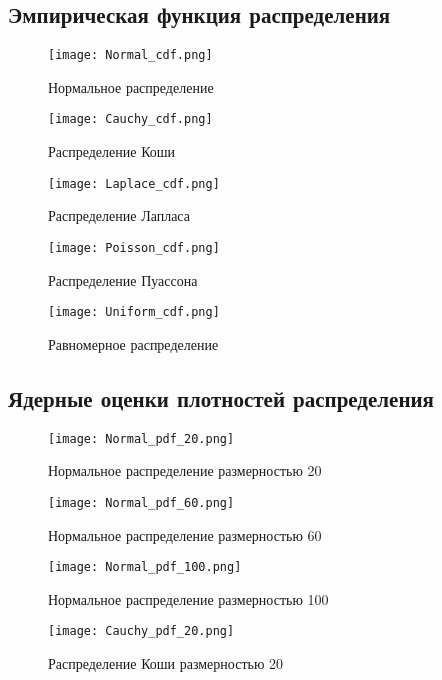 \documentclass[12pt,a4paper]{article}
\begin{document}
\subsection{Эмпирическая функция распределения}
\begin{figure}[H]
    \centering
    \texttt{[image: Normal\_cdf.png]}
    \caption{Нормальное распределение}
\end{figure}

\begin{figure}[H]
    \centering
    \texttt{[image: Cauchy\_cdf.png]}
    \caption{Распределение Коши}
\end{figure}

\begin{figure}[H]
    \centering
    \texttt{[image: Laplace\_cdf.png]}
    \caption{Распределение Лапласа}
\end{figure}

\begin{figure}[H]
    \centering
    \texttt{[image: Poisson\_cdf.png]}
    \caption{Распределение Пуассона}
\end{figure}

\begin{figure}[H]
    \centering
    \texttt{[image: Uniform\_cdf.png]}
    \caption{Равномерное распределение}
\end{figure}

\subsection{Ядерные оценки плотностей распределения}
\begin{figure}[H]
    \centering
    \texttt{[image: Normal\_pdf\_20.png]}
    \caption{Нормальное распределение размерностью 20}
\end{figure}

\begin{figure}[H]
    \centering
    \texttt{[image: Normal\_pdf\_60.png]}
    \caption{Нормальное распределение размерностью 60}
\end{figure}

\begin{figure}[H]
    \centering
    \texttt{[image: Normal\_pdf\_100.png]}
    \caption{Нормальное распределение размерностью 100}
\end{figure}

\begin{figure}[H]
    \centering
    \texttt{[image: Cauchy\_pdf\_20.png]}
    \caption{Распределение Коши размерностью 20}
\end{figure}
\end{document}
